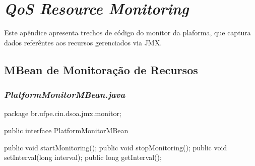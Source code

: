 \chapter{\textit{QoS Resource Monitoring}}

Este apêndice apresenta trechos de código do monitor da plaforma, que captura dados referêntes aos recursos gerenciados via JMX.\\

\section{MBean de Monitoração de Recursos}

\subsection*{\!\textsl{\textbf{PlatformMonitorMBean.java}}}
\begin{verbatimtab}[4]
package br.ufpe.cin.dsoa.jmx.monitor;

public interface PlatformMonitorMBean {

	public void startMonitoring();
	public void stopMonitoring();
	public void setInterval(long interval);
	public long getInterval();

}

\end{verbatimtab}

